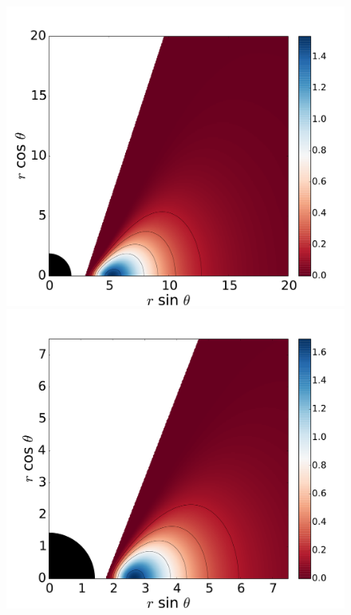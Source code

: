 \documentclass{aa}
\begin{document}
\begin{figure}
\centering
\includegraphics[scale=0.16]{figures/fig2_1_1.pdf}
\hspace{-0.3cm}
\includegraphics[scale=0.16]{figures/fig2_1_2.pdf}
\hspace{-0.3cm}

\end{figure}
\end{document}

